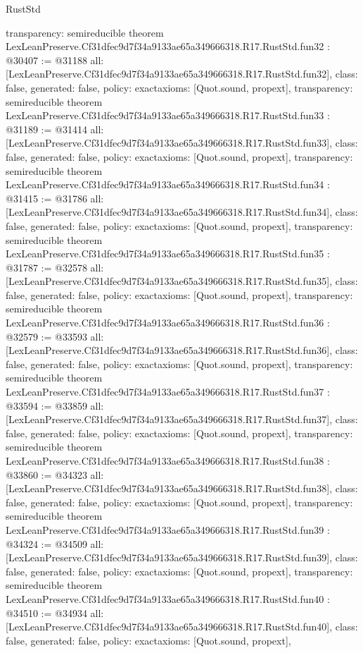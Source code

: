 \begin{lexlean}{RustStd}
\begin{coremodule}
{  transparency: semireducible
}
theorem LexLeanPreserve.Cf31dfec9d7f34a9133ae65a349666318.R17.RustStd.fun32 : @30407 := @31188 {
  all: [LexLeanPreserve.Cf31dfec9d7f34a9133ae65a349666318.R17.RustStd.fun32],
  class: false,
  generated: false,
  policy: exact{axioms: [Quot.sound, propext]},
  transparency: semireducible
}
theorem LexLeanPreserve.Cf31dfec9d7f34a9133ae65a349666318.R17.RustStd.fun33 : @31189 := @31414 {
  all: [LexLeanPreserve.Cf31dfec9d7f34a9133ae65a349666318.R17.RustStd.fun33],
  class: false,
  generated: false,
  policy: exact{axioms: [Quot.sound, propext]},
  transparency: semireducible
}
theorem LexLeanPreserve.Cf31dfec9d7f34a9133ae65a349666318.R17.RustStd.fun34 : @31415 := @31786 {
  all: [LexLeanPreserve.Cf31dfec9d7f34a9133ae65a349666318.R17.RustStd.fun34],
  class: false,
  generated: false,
  policy: exact{axioms: [Quot.sound, propext]},
  transparency: semireducible
}
theorem LexLeanPreserve.Cf31dfec9d7f34a9133ae65a349666318.R17.RustStd.fun35 : @31787 := @32578 {
  all: [LexLeanPreserve.Cf31dfec9d7f34a9133ae65a349666318.R17.RustStd.fun35],
  class: false,
  generated: false,
  policy: exact{axioms: [Quot.sound, propext]},
  transparency: semireducible
}
theorem LexLeanPreserve.Cf31dfec9d7f34a9133ae65a349666318.R17.RustStd.fun36 : @32579 := @33593 {
  all: [LexLeanPreserve.Cf31dfec9d7f34a9133ae65a349666318.R17.RustStd.fun36],
  class: false,
  generated: false,
  policy: exact{axioms: [Quot.sound, propext]},
  transparency: semireducible
}
theorem LexLeanPreserve.Cf31dfec9d7f34a9133ae65a349666318.R17.RustStd.fun37 : @33594 := @33859 {
  all: [LexLeanPreserve.Cf31dfec9d7f34a9133ae65a349666318.R17.RustStd.fun37],
  class: false,
  generated: false,
  policy: exact{axioms: [Quot.sound, propext]},
  transparency: semireducible
}
theorem LexLeanPreserve.Cf31dfec9d7f34a9133ae65a349666318.R17.RustStd.fun38 : @33860 := @34323 {
  all: [LexLeanPreserve.Cf31dfec9d7f34a9133ae65a349666318.R17.RustStd.fun38],
  class: false,
  generated: false,
  policy: exact{axioms: [Quot.sound, propext]},
  transparency: semireducible
}
theorem LexLeanPreserve.Cf31dfec9d7f34a9133ae65a349666318.R17.RustStd.fun39 : @34324 := @34509 {
  all: [LexLeanPreserve.Cf31dfec9d7f34a9133ae65a349666318.R17.RustStd.fun39],
  class: false,
  generated: false,
  policy: exact{axioms: [Quot.sound, propext]},
  transparency: semireducible
}
theorem LexLeanPreserve.Cf31dfec9d7f34a9133ae65a349666318.R17.RustStd.fun40 : @34510 := @34934 {
  all: [LexLeanPreserve.Cf31dfec9d7f34a9133ae65a349666318.R17.RustStd.fun40],
  class: false,
  generated: false,
  policy: exact{axioms: [Quot.sound, propext]},
}
\end{coremodule}
\end{lexlean}
